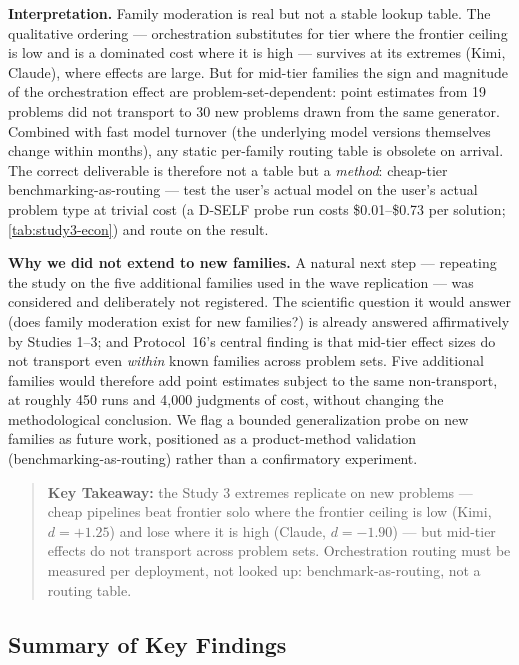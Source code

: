 \documentclass[12pt,a4paper]{article}
\begin{document}
\textbf{Interpretation.} Family moderation is real but not a stable lookup
table. The qualitative ordering --- orchestration substitutes for tier where
the frontier ceiling is low and is a dominated cost where it is high ---
survives at its extremes (Kimi, Claude), where effects are large. But for
mid-tier families the sign and magnitude of the orchestration effect are
problem-set-dependent: point estimates from 19 problems did not transport to
30 new problems drawn from the same generator. Combined with fast model
turnover (the underlying model versions themselves change within months),
any static per-family routing table is obsolete on arrival. The correct
deliverable is therefore not a table but a \emph{method}: cheap-tier
benchmarking-as-routing --- test the user's actual model on the user's actual
problem type at trivial cost (a D-SELF probe run costs \$0.01--\$0.73 per
solution; \cref{tab:study3-econ}) and route on the result.

\textbf{Why we did not extend to new families.} A natural next step ---
repeating the study on the five additional families used in the wave
replication --- was considered and deliberately not registered. The
scientific question it would answer (does family moderation exist for new
families?) is already answered affirmatively by Studies 1--3; and
Protocol~16's central finding is that mid-tier effect sizes do not transport
even \emph{within} known families across problem sets. Five additional
families would therefore add point estimates subject to the same
non-transport, at roughly 450 runs and 4{,}000 judgments of cost, without
changing the methodological conclusion. We flag a bounded generalization
probe on new families as future work, positioned as a product-method
validation (benchmarking-as-routing) rather than a confirmatory experiment.

\begin{quote}
\textbf{Key Takeaway:} the Study 3 extremes replicate on new problems ---
cheap pipelines beat frontier solo where the frontier ceiling is low (Kimi,
$d = +1.25$) and lose where it is high (Claude, $d = -1.90$) --- but
mid-tier effects do not transport across problem sets. Orchestration routing
must be measured per deployment, not looked up: benchmark-as-routing, not a
routing table.
\end{quote}

\subsection{Summary of Key Findings}
\end{document}
